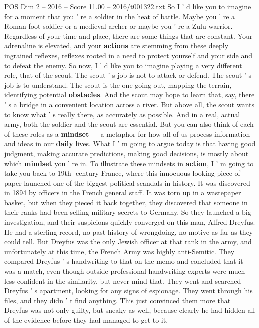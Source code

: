 \begin{textsample}{POS Dim 2 – 2016 – Score 11.00 – 2016/t001322.txt}  \label{ex:f2_pos_044}
So I ' d like you to imagine for a moment that you ' re a soldier in the heat of battle.
Maybe you ' re a Roman foot soldier or a medieval archer or maybe you ' re a Zulu warrior.
Regardless of your time and place, there are some things that are constant.
Your adrenaline is elevated, and your \textbf{actions} are stemming from these deeply ingrained reflexes, reflexes rooted in a need to protect yourself and your side and to defeat the enemy.
So now, I ' d like you to imagine playing a very different role, that of the scout.
The scout ' s job is not to attack or defend.
The scout ' s job is to understand.
The scout is the one going out, mapping the terrain, identifying potential \textbf{obstacles}.
And the scout may hope to learn that, say, there ' s a bridge in a convenient location across a river.
But above all, the scout wants to know what ' s really there, as accurately as possible.
And in a real, actual army, both the soldier and the scout are essential.
But you can also think of each of these roles as a \textbf{mindset} — a metaphor for how all of us process information and ideas in our \textbf{daily} lives.
What I ' m going to argue today is that having good judgment, making accurate predictions, making good decisions, is mostly about which \textbf{mindset} you ' re in.
To illustrate these mindsets in \textbf{action}, I ' m going to take you back to 19th- century France, where this innocuous-looking piece of paper launched one of the biggest political scandals in history.
It was discovered in 1894 by officers in the French general staff.
It was torn up in a wastepaper basket, but when they pieced it back together, they discovered that someone in their ranks had been selling military secrets to Germany.
So they launched a big investigation, and their suspicions quickly converged on this man, Alfred Dreyfus.
He had a sterling record, no past history of wrongdoing, no motive as far as they could tell.
But Dreyfus was the only Jewish officer at that rank in the army, and unfortunately at this time, the French Army was highly anti-Semitic.
They compared Dreyfus ' s handwriting to that on the memo and concluded that it was a match, even though outside professional handwriting experts were much less confident in the similarity, but never mind that.
They went and searched Dreyfus ' s apartment, looking for any signs of espionage.
They went through his files, and they didn ' t find anything.
This just convinced them more that Dreyfus was not only guilty, but sneaky as well, because clearly he had hidden all of the evidence before they had managed to get to it.

\end{textsample}
